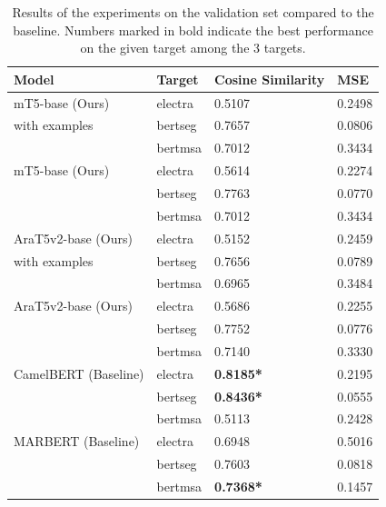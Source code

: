 \documentclass[12pt]{article}
\begin{document}
\begin{table}[H]
    \centering
    \caption{Results of the experiments on the validation set compared to the baseline. Numbers marked in bold indicate the best performance on the given target among the 3 targets.}
    \label{table:results}
    \renewcommand{\arraystretch}{1.5}%
    \begin{tabularx}{\textwidth}{|>{\raggedright}l|>{\raggedright\arraybackslash}X|X|X|}
        \hline
        \textbf{Model} & \textbf{Target} & \textbf{Cosine Similarity} & \textbf{MSE} \\
        \hline
        mT5-base (Ours) & electra & 0.5107 & 0.2498 \\\cline{2-4}
        with examples & bertseg & 0.7657 & 0.0806 \\\cline{2-4}
        & bertmsa & 0.7012 & 0.3434 \\\cline{2-4}
        \hline
        mT5-base (Ours) & electra & 0.5614 & 0.2274 \\\cline{2-4}
        & bertseg & 0.7763 & 0.0770 \\\cline{2-4}
        & bertmsa & 0.7012 & 0.3434 \\\cline{2-4}
        \hline
        AraT5v2-base (Ours) & electra & 0.5152 & 0.2459 \\\cline{2-4}
        with examples & bertseg & 0.7656 & 0.0789 \\\cline{2-4}
        & bertmsa & 0.6965 & 0.3484 \\\cline{2-4}
        \hline
        AraT5v2-base (Ours) & electra & 0.5686 & 0.2255 \\\cline{2-4}
        & bertseg & 0.7752 & 0.0776 \\\cline{2-4}
        & bertmsa & 0.7140 & 0.3330 \\\cline{2-4}
        \hline
        CamelBERT (Baseline) & electra & \textbf{0.8185*} & 0.2195 \\\cline{2-4}
        & bertseg & \textbf{0.8436*} & 0.0555 \\\cline{2-4}
        & bertmsa & 0.5113 & 0.2428 \\\cline{2-4}
        \hline
        MARBERT (Baseline) & electra & 0.6948 & 0.5016 \\\cline{2-4}
        & bertseg & 0.7603 & 0.0818 \\\cline{2-4}
        & bertmsa & \textbf{0.7368*} & 0.1457 \\\cline{2-4}
        \hline
    \end{tabularx}
\end{table}
\end{document}
